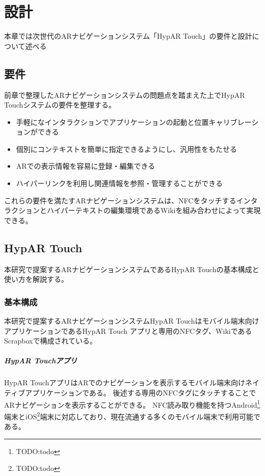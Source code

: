 \chapter{設計}
\label{chap:design}

本章では次世代のARナビゲーションシステム「HypAR Touch」の要件と設計について述べる

\newpage

\section{要件}
前章で整理したARナビゲーションシステムの問題点を踏まえた上でHypAR Touchシステムの要件を整理する。
\begin{itemize}
  \item 手軽になインタラクションでアプリケーションの起動と位置キャリブレーションができる
  \item 個別にコンテキストを簡単に指定できるようにし、汎用性をもたせる
  \item ARでの表示情報を容易に登録・編集できる
  \item ハイパーリンクを利用し関連情報を参照・管理することができる
\end{itemize}
これらの要件を満たすARナビゲーションシステムは、NFCをタッチするインタラクションとハイパーテキストの編集環境であるWikiを組み合わせによって実現できる。

\section{HypAR Touch}
本研究で提案するARナビゲーションシステムであるHypAR Touchの基本構成と使い方を解説する。

\subsection{基本構成}
本研究で提案するARナビゲーションシステムHypAR Touchはモバイル端末向けアプリケーションであるHypAR Touch アプリと専用のNFCタグ、WikiであるScrapboxで構成されている。

\paragraph*{HypAR Touchアプリ} 
HypAR TouchアプリはARでのナビゲーションを表示するモバイル端末向けネイティブアプリケーションである。
後述する専用のNFCタグにタッチすることでARナビゲーションを表示することができる。
NFC読み取り機能を持つAndroid\footnote{\textsf{TODO:todo}}端末とiOS\footnote{\textsf{TODO:todo}}端末に対応しており、現在流通する多くのモバイル端末で利用可能である。

